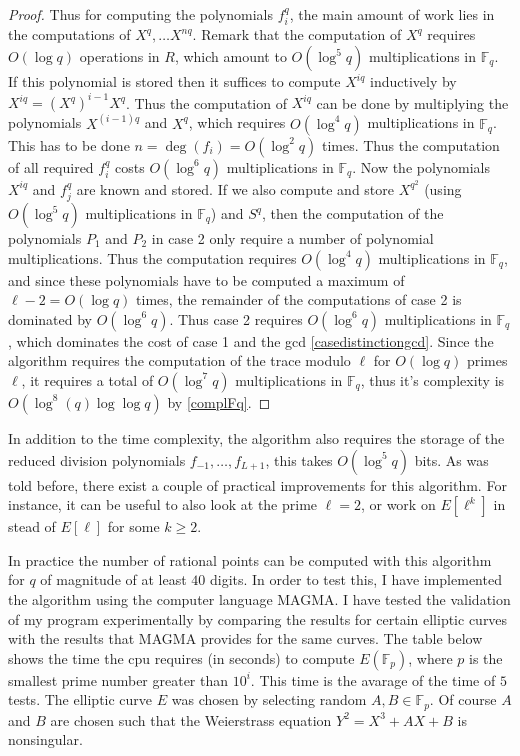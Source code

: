 \documentclass{article}
\numberwithin{equation}{section}
\theoremstyle{definition}
\newcommand{\FF}[1]{{\mathbb F}_{#1}} %
\newcommand{\degree}[1]{\operatorname{deg} \left(#1\right)} %
\begin{document}
\begin{proof}
Thus for computing the polynomials $f_i^q$, the main amount of work lies in the computations of $X^q,\ldots X^{nq}$. Remark that the computation of $X^q$ requires $O(\log q)$ operations in $R$, which amount to $O(\log ^5 q)$ multiplications in $\FF{q}$. If this polynomial is stored then it suffices to compute $X^{iq}$ inductively by $X^{iq}=(X^q)^{i-1}X^q$. Thus the computation of $X^{iq}$ can be done by multiplying the polynomials $X^{(i-1)q}$ and $X^q$, which requires $O(\log^4 q)$ multiplications in $\FF{q}$. This has to be done $n=\degree{f_i} = O(\log^2 q)$ times. Thus the computation of all required $f_i^q$ costs $O(\log^6 q)$ multiplications in $\FF{q}$. Now the polynomials $X^{iq}$ and $f_j^q$ are known and stored. If we also compute and store $X^{q^2}$ (using $O(\log^5 q)$ multiplications in $\FF{q}$) and $S^q$, then the computation of the polynomials $P_1$ and $P_2$ in case 2 only require a number of polynomial multiplications. Thus the computation requires $O(\log ^4 q)$ multiplications in $\FF{q}$, and since these polynomials have to be computed a maximum of $\ell-2  = O(\log q)$ times, the remainder of the computations of case 2 is dominated by $O(\log ^6 q)$. Thus case 2 requires $O(\log ^6 q)$ multiplications in $\FF{q}$, which dominates the cost of case 1 and the gcd \ref{casedistinctiongcd}. Since the algorithm requires the computation of the trace modulo $\ell$ for $O(\log q)$ primes $\ell$, it requires a total of $O(\log ^7 q)$ multiplications in $\FF{q}$, thus it's complexity is $O(\log^8 (q) \log \log q)$ by \ref{complFq}.
\end{proof}

In addition to the time complexity, the algorithm also requires the storage of the reduced division polynomials $f_{-1},\ldots,f_{L+1}$, this takes $O(\log^5 q)$ bits. As was told before, there exist a couple of practical improvements for this algorithm. For instance, it can be useful to also look at the prime $\ell = 2$, or work on $E[\ell^k]$ in stead of $E[\ell]$ for some $k \geq 2$.\par 
In practice the number of rational points can be computed with this algorithm for $q$ of magnitude of at least $40$ digits. In order to test this, I have implemented the algorithm using the computer language MAGMA. I have tested the validation of my program experimentally by comparing the results for certain elliptic curves with the results that MAGMA provides for the same curves. The table below shows the time the cpu requires (in seconds) to compute $E(\FF{p})$, where $p$ is the smallest prime number greater than $10^i$. This time is the avarage of the time of $5$ tests. The elliptic curve $E$ was chosen by selecting random $A,B \in \FF{p}$. Of course $A$ and $B$ are chosen such that the Weierstrass equation $Y^2=X^3+AX+B$ is nonsingular. 
\end{document}
